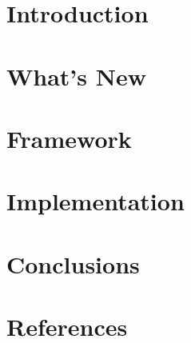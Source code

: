 \section[Intro]{Introduction}


\section[New]{What's New}


\section[FRW]{Framework}


\section[Impl]{Implementation}


\section[Concl]{Conclusions}


\section[Refs]{References}
